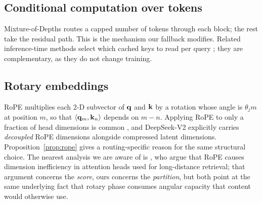 \subsection{Conditional computation over tokens}

Mixture-of-Depths \citep{raposo2024mixture} routes a capped number of tokens through each block; the rest take the residual path. This is the mechanism our fallback modifies. Related inference-time methods select which cached keys to read per query \citep{zhang2023h2o,tang2024quest}; they are complementary, as they do not change training.

\subsection{Rotary embeddings}

RoPE \citep{su2024roformer} multiplies each 2-D subvector of $\mathbf{q}$ and $\mathbf{k}$ by a rotation whose angle is $\theta_j m$ at position $m$, so that $\langle \mathbf{q}_m, \mathbf{k}_n\rangle$ depends on $m - n$. Applying RoPE to only a fraction of head dimensions is common \citep{black2022gptneox}, and DeepSeek-V2 \citep{deepseekv2} explicitly carries \emph{decoupled} RoPE dimensions alongside compressed latent dimensions. Proposition~\ref{prop:rope} gives a routing-specific reason for the same structural choice. The nearest analysis we are aware of is \citet{chiang2025ropedim}, who argue that RoPE causes dimension inefficiency in attention heads used for long-distance retrieval; that argument concerns the \emph{score}, ours concerns the \emph{partition}, but both point at the same underlying fact that rotary phase consumes angular capacity that content would otherwise use.

